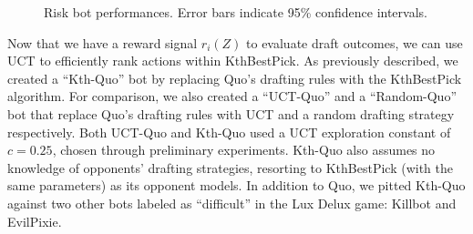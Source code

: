 \documentclass[letterpaper]{article}
\numberwithin{equation}{section}
\numberwithin{theorem}{section}
\numberwithin{lemma}{section}
\numberwithin{df}{section}
\begin{document}
\begin{figure}[t]
{		\label{fig:KthQuoEvilP}
	} %
	\caption[]{Risk bot performances.  Error bars indicate 95\% confidence intervals.}
	\label{fig:RiskResults}
\end{figure}

Now that we have a reward signal $r_i(Z)$ to evaluate draft outcomes, we can use UCT to efficiently rank actions within KthBestPick.  As previously described, we created a ``Kth-Quo'' bot by replacing Quo's drafting rules with the KthBestPick algorithm.  For comparison, we also created a ``UCT-Quo'' and a ``Random-Quo'' bot that replace Quo's drafting rules with UCT and a random drafting strategy respectively.  Both UCT-Quo and Kth-Quo used a UCT exploration constant of $c=0.25$, chosen through preliminary experiments.  Kth-Quo also assumes no knowledge of opponents' drafting strategies, resorting to KthBestPick (with the same parameters) as its opponent models.  In addition to Quo, we pitted Kth-Quo against two other bots labeled as ``difficult'' in the Lux Delux game: Killbot and EvilPixie.  

\end{document}
